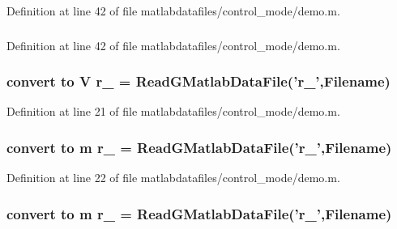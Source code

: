 Definition at line 42 of file matlabdatafiles/control\_\-mode/demo.m.
\subsubsection[{pi}]{}\label{matlabdatafiles_2control__mode_2demo_8m_a16d5d24f5b09a1991bd4e5f57bf11237}


Definition at line 42 of file matlabdatafiles/control\_\-mode/demo.m.
\subsubsection[{r\_\-1}]{\setlength{\rightskip}{0pt plus 5cm}convert to V r\_ = ReadGMatlabDataFile('r\_',{\bf Filename})}\label{matlabdatafiles_2control__mode_2demo_8m_a42f132e2f712134d1339dec81b3a6b04}


Definition at line 21 of file matlabdatafiles/control\_\-mode/demo.m.
\subsubsection[{r\_\-2}]{\setlength{\rightskip}{0pt plus 5cm}convert to m r\_ = ReadGMatlabDataFile('r\_',{\bf Filename})}\label{matlabdatafiles_2control__mode_2demo_8m_aebd5e602e2c6cbe7902e50a37467e336}


Definition at line 22 of file matlabdatafiles/control\_\-mode/demo.m.
\subsubsection[{r\_\-3}]{\setlength{\rightskip}{0pt plus 5cm}convert to m r\_ = ReadGMatlabDataFile('r\_',{\bf Filename})}\label{matlabdatafiles_2control__mode_2demo_8m_a1471055915ad3f212e35185bfc74addf}


